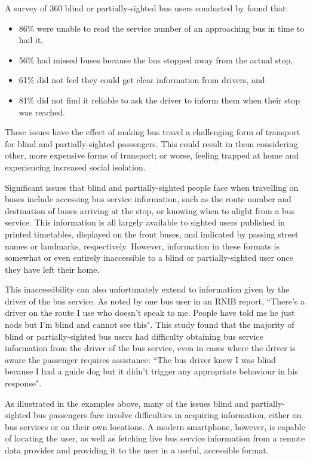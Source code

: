 \documentclass[10pt,twocolumn]{article}
\newcommand{\citep}[1]{}
\begin{document}
A survey of 360 blind or partially-sighted bus users conducted by \cite{stopForMe} found that:
\begin{itemize}
\item 86\% were unable to read the service number of an approaching bus in time to hail it,
\item 56\% had missed buses because the bus stopped away from the actual stop,
\item 61\% did not feel they could get clear information from drivers, and
\item 81\% did not find it reliable to ask the driver to inform them when their stop was reached.
\end{itemize}

These issues have the effect of making bus travel a challenging form of transport for blind and partially-sighted passengers.  This could result in them considering other, more expensive forms of transport; or worse, feeling trapped at home and experiencing increased social isolation.

Significant issues that blind and partially-sighted people face when travelling on buses include accessing bus service information, such as the route number and destination of buses arriving at the stop, or knowing when to alight from a bus service\citep{stopForMe}. This information is all largely available to sighted users published in printed timetables, displayed on the front buses, and indicated by passing street names or landmarks, respectively. However, information in these formats is somewhat or even entirely inaccessible to a blind or partially-sighted user once they have left their home. 

This inaccessibility can also unfortunately extend to information given by the driver of the bus service. As noted by one bus user in an RNIB report, ``There's a driver on the route I use who doesn't speak to me. People have told me he just nods but I'm blind and cannot see this"\citep{stopForMe}. This study found that the majority of blind or partially-sighted bus users had difficulty obtaining bus service information from the driver of the bus service, even in cases where the driver is aware the passenger requires assistance: ``The bus driver knew I was blind because I had a guide dog but it didn't trigger any appropriate behaviour in his response".

As illustrated in the examples above, many of the issues blind and partially-sighted bus passengers face involve difficulties in acquiring information, either on bus services or on their own locations.  A modern smartphone, however, is capable of locating the user, as well as fetching live bus service information from a remote data provider and providing it to the user in a useful, accessible format.
\end{document}
